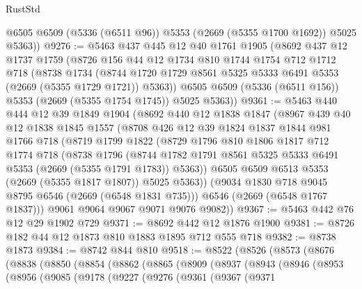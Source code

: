 \begin{lexlean}{RustStd}
\begin{coremodule}
        @6505
        @6509
        (@5336 (@6511 @96))
        @5353
        (@2669 (@5355 @1700 @1692))
        @5025
        @5363))
@9276 := @5463
    @437
    @445
    @12
    @40
    @1761
    @1905
    (@8692
      @437
      @12
      @1737
      @1759
      (@8726
        @156
        @44
        @12
        @1734
        @810
        @1744
        @1754
        @712
        @1712
        @718
        (@8738
          @1734
          (@8744 @1720 @1729 @8561 @5325 @5333 @6491 @5353 (@2669 (@5355 @1729 @1721)) @5363))
        @6505
        @6509
        (@5336 (@6511 @156))
        @5353
        (@2669 (@5355 @1754 @1745))
        @5025
        @5363))
@9361 := @5463
    @440
    @444
    @12
    @39
    @1849
    @1904
    (@8692
      @440
      @12
      @1838
      @1847
      (@8967
        @439
        @40
        @12
        @1838
        @1845
        @1557
        (@8708
          @426
          @12
          @39
          @1824
          @1837
          @1844
          @981
          @1766
          @718
          (@8719
            @1799
            @1822
            (@8729
              @1796
              @810
              @1806
              @1817
              @712
              @1774
              @718
              (@8738
                @1796
                (@8744 @1782 @1791 @8561 @5325 @5333 @6491 @5353 (@2669 (@5355 @1791 @1783)) @5363))
              @6505
              @6509
              @6513
              @5353
              (@2669 (@5355 @1817 @1807))
              @5025
              @5363))
          (@9034 @1830 @718 @9045 @8795 @6546 (@2669 (@6548 @1831 @735)))
          @6546
          (@2669 (@6548 @1767 @1837)))
        @9061
        @9064
        @9067
        @9071
        @9076
        @9082))
@9367 := @5463 @442 @76 @12 @29 @1902 @729
@9371 := @8692 @442 @12 @1876 @1900
@9381 := @8726 @182 @44 @12 @1873 @810 @1883 @1895 @712 @555 @718
@9382 := @8738 @1873
@9384 := @8742 @844 @810
@9518 := @8522
    (@8526
      (@8573
        (@8676
          (@8838
            (@8850
              (@8854
                (@8862
                  (@8865
                    (@8909
                      (@8937
                        (@8943
                          (@8946
                            (@8953
                              (@8956
                                (@9085
                                  (@9178
                                    (@9227
                                      (@9276
                                        (@9361
                                          (@9367
                                            (@9371

\end{coremodule}
\end{lexlean}
